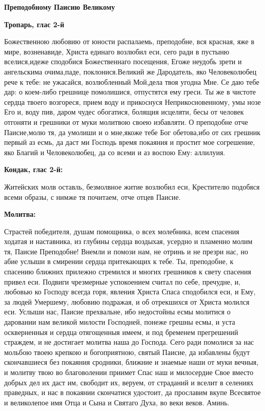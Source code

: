 \mychapterending




\bfseries Преподобному Паисию Великому\normalfont{}


\medskip


\bfseries Тропарь, глас 2-й\normalfont{}


Божественною любовию от юности распалаемь, преподобне, вся красная, яже в мире, возненавиде, Христа единаго возлюбил еси, сего ради в пустыню вселися,идеже сподобися Божественнаго посещения, Егоже неудобь зрети и ангельскима очима,паде, поклонися.Великий же Дародатель, яко Человеко­любец рече к тебе: не ужасайся, возлюб­ленный Мой,дела твоя угодна Мне. Се даю тебе дар: о коем-либо грешнице помолишися, отпустятся ему греси. Ты же в чистоте сердца твоего возгореся, прием воду и прикоснуся Неприкосно­венному, умы нозе Его и, воду пив, да­ром чудес обогатися, болящия исцеляти, бесы от человек отгоняти и грешни­ки от муки молитвою своею избавляти. О преподобне отче Паисие,молю тя, да умолиши и о мне,якоже тебе Бог обетова,ибо от сих грешник первый аз есмь, да даст ми Господь время покаяния и простит мое согрешение, яко Благий и Человеколюбец, да со всеми и аз воспою Ему: аллилуия.


\medskip


\bfseries Кондак, глас 2-й:\normalfont{}


Житейских молв оставль, безмолвное житие возлюбил еси, Крестителю подобяся всеми образы, с нимже тя почитаем, отче отцев Паисие.


\medskip


\bfseries Молитва:\normalfont{}


Страстей победителя, душам помощника, о всех молебника, всем спасения ходатая и наставника, из глубины сердца воздыхая, усердно и пламенно молим тя, Паисие Преподобне! Внемли и помози нам, не отринь и не презри нас, но абие услыши в смирении сердца притекающих к тебе. Ты, преподобне, к спасению ближних прилежно стремился и многих грешников к свету спасения привел еси. Подвиги чрезмерные успокоением считал по себе, пречудне, и, любовью ко Господу всегда горя, явления Христа Спаса сподобился еси, и Ему, за людей Умершему, любовию подражая, и об отрекшихся от Христа молился еси. Услыши нас, Паисие прехвальне, ибо недостойны есмы молитися о даровании нам великой милости Господней, понеже грешны есмы, и уста оскверненныя и сердца отягощенныя имеем, и под бременем прегрешений страждем, и не достигает молитва наша до Господа. Сего ради помолися за нас мольбою твоею крепкою и богоприятною, святый Паисие, да избавлены будут скончавшиеся без покаяния сродники, ближние и знаемые наши от муки вечныя, и молитву твою во благоволении приимет Спас наш и милосердие Свое вместо добрых дел их даст им, свободит их, веруем, от страданий и вселит в селениях праведных, и нас в покаянии скончатися удостоит, да прославим вкупе Всесвятое и великолепое имя Отца и Сына и Святаго Духа, во веки веков. Аминь.


